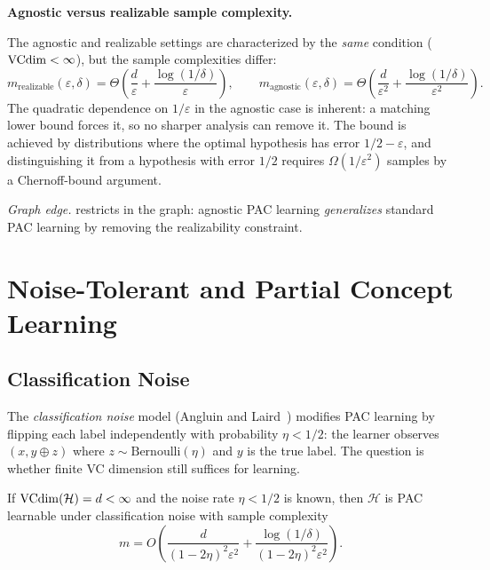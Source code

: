 \begin{separation}
\textbf{Agnostic versus realizable sample complexity.}

\medskip\noindent
The agnostic and realizable settings are characterized by the \emph{same}
condition ($\mathrm{VCdim} < \infty$), but the sample complexities differ:
\[
  m_{\mathrm{realizable}}(\varepsilon, \delta)
  = \Theta\!\left(\frac{d}{\varepsilon} + \frac{\log(1/\delta)}{\varepsilon}\right),
  \qquad
  m_{\mathrm{agnostic}}(\varepsilon, \delta)
  = \Theta\!\left(\frac{d}{\varepsilon^2} + \frac{\log(1/\delta)}{\varepsilon^2}\right).
\]
The quadratic dependence on $1/\varepsilon$ in the agnostic case is inherent: a
matching lower bound forces it, so no sharper analysis can remove it.  The bound is achieved by
distributions where the optimal hypothesis has error $1/2 - \varepsilon$,
and distinguishing it from a hypothesis with error $1/2$ requires
$\Omega(1/\varepsilon^2)$ samples by a Chernoff-bound argument.

\medskip\noindent
\emph{Graph edge.}   restricts 
in the graph: agnostic PAC learning \emph{generalizes} standard PAC learning by
removing the realizability constraint.
\end{separation}



\section{Noise-Tolerant and Partial Concept Learning}
\label{sec:noise-partial}

\subsection{Classification Noise}

The \emph{classification noise} model (Angluin and
Laird~\cite{AngluinLaird1988}) modifies PAC learning by flipping each
label independently with probability $\eta < 1/2$: the learner observes
$(x, y \oplus z)$ where $z \sim \mathrm{Bernoulli}(\eta)$ and $y$ is the true
label.  The question is whether finite VC dimension still suffices for
learning.

\begin{thm}
\label{thm:noise-tolerant}
If $\mathrm{VCdim}(\mathcal{H}) = d < \infty$ and the noise rate $\eta < 1/2$ is known,
then $\mathcal{H}$ is PAC learnable under classification noise with sample
complexity
\[
  m = O\!\left(\frac{d}{(1-2\eta)^2 \varepsilon^2}
  + \frac{\log(1/\delta)}{(1-2\eta)^2 \varepsilon^2}\right).
\]
\end{thm}

